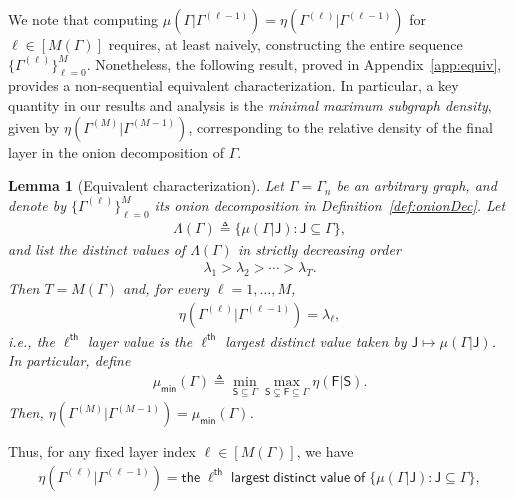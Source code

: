 \documentclass[12pt]{article}
\newtheorem{lemma}{Lemma}
\newcommand{\s}[1]{\mathsf{#1}}
\begin{document}
We note that computing $\mu(\Gamma\vert\Gamma^{(\ell-1)})=\eta(\Gamma^{(\ell)}\vert \Gamma^{(\ell-1)})$ for $\ell\in[M(\Gamma)]$ requires, at least naively, constructing the entire sequence $\{\Gamma^{(\ell)}\}_{\ell=0}^{M}$. Nonetheless, the following result, proved in Appendix~\ref{app:equiv}, provides a non-sequential equivalent characterization. In particular, a key quantity in our results and analysis is the \emph{minimal maximum subgraph density}, given by $\eta(\Gamma^{(M)}\vert \Gamma^{(M-1)})$, corresponding to the relative density of the final layer in the onion decomposition of $\Gamma$.
\begin{lemma}[Equivalent characterization]\label{lem:equivminimalMSD}
Let $\Gamma = \Gamma_n$ be an arbitrary graph, and denote by $\{ \Gamma^{(\ell)} \}_{\ell=0}^{M}$ its onion decomposition in Definition~\ref{def:onionDec}. Let
\begin{align}
\Lambda(\Gamma)\triangleq\{\mu(\Gamma\vert\s{J}): \s{J}\subseteq \Gamma\},
\end{align}
and list the distinct values of $\Lambda(\Gamma)$ in strictly decreasing order
\begin{align}
\lambda_1>\lambda_2>\cdots>\lambda_T.
\end{align}
Then $T=M(\Gamma)$ and, for every $\ell=1,\dots,M$,
\begin{align}
\eta\left(\Gamma^{(\ell)}\vert\Gamma^{(\ell-1)}\right)
=\lambda_\ell,
\end{align}
i.e., the $\ell^{\s{th}}$ layer value is the $\ell^{\s{th}}$ largest distinct value taken by $\s{J}\mapsto\mu(\Gamma\vert\s{J})$. %
In particular, define
\begin{align}
\mu_{\s{min}}(\Gamma) \triangleq \min_{\s{S}\subseteq \Gamma}\max_{\s{S}\subsetneq\s{F}\subseteq\Gamma}\eta(\s{F}\vert\s{S}).\label{eqn:minimaxSubDen}
\end{align}
Then, $\eta(\Gamma^{(M)}\vert \Gamma^{(M-1)})=\mu_{\s{min}}(\Gamma)$.
\end{lemma}
Thus, for any fixed layer index $\ell\in[M(\Gamma)]$, we have
\begin{align}
  \eta \left(\Gamma^{(\ell)}\vert\Gamma^{(\ell-1)}\right)
  =\s{the}\;\ell^{\s{th}}\;\s{largest}\;\s{distinct}\;\s{value}\;\s{of}\; \{\mu(\Gamma\vert\s{J}):\s{J}\subseteq\Gamma\},
\end{align}
\end{document}
